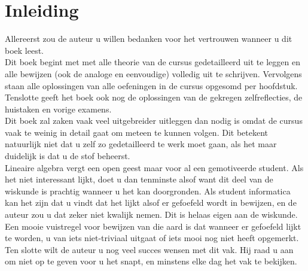 \documentclass[lineaire_algebra_oplossingen.tex]{subfiles}
\begin{document}
\newpage
\section*{Inleiding}

\noindent Allereerst zou de auteur u willen bedanken voor het vertrouwen wanneer u dit boek leest.\\

\noindent Dit boek begint met met alle theorie van de cursus gedetailleerd uit te leggen en alle bewijzen (ook de analoge en eenvoudige) volledig uit te schrijven. Vervolgens staan alle oplossingen van alle oefeningen in de cursus opgesomd per hoofdstuk. Tenslotte geeft het boek ook nog de oplossingen van de gekregen zelfreflecties, de huistaken en vorige examens.\\

\noindent Dit boek zal zaken vaak veel uitgebreider uitleggen dan nodig is omdat de cursus vaak te weinig in detail gaat om meteen te kunnen volgen. Dit betekent natuurlijk niet dat u zelf zo gedetailleerd te werk moet gaan, als het maar duidelijk is dat u de stof beheerst.\\

\noindent Lineaire algebra vergt een open geest maar voor al een gemotiveerde student.
Als het niet interessant lijkt, doet u dan tenminste alsof want dit deel van de wiskunde is prachtig wanneer u het kan doorgronden.
Als student informatica kan het zijn dat u vindt dat het lijkt alsof er gefoefeld wordt in bewijzen, en de auteur zou u dat zeker niet kwalijk nemen. Dit is helaas eigen aan de wiskunde.
Een mooie vuistregel voor bewijzen van die aard is dat wanneer er gefoefeld lijkt te worden, u van iets niet-triviaal uitgaat of iets mooi nog niet heeft opgemerkt.\\

\noindent Ten slotte wilt de auteur u nog veel succes wensen met dit vak. Hij raad u aan om niet op te geven voor u het snapt, en minstens elke dag het vak te bekijken.
\end{document}
